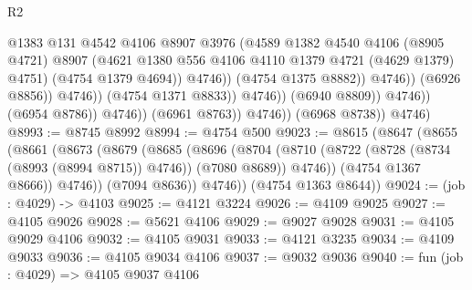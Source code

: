 \begin{lexlean}{R2}
\begin{coremodule}
                                                @1383
                                                @131
                                                @4542
                                                @4106
                                                @8907
                                                @3976
                                                (@4589
                                                  @1382
                                                  @4540
                                                  @4106
                                                  (@8905 @4721)
                                                  @8907
                                                  (@4621
                                                    @1380
                                                    @556
                                                    @4106
                                                    @4110
                                                    @1379
                                                    @4721
                                                    (@4629 @1379)
                                                    @4751)
                                                  (@4754 @1379 @4694))
                                                @4746))
                                            (@4754 @1375 @8882))
                                          @4746))
                                      (@6926 @8856))
                                    @4746))
                                (@4754 @1371 @8833))
                              @4746))
                          (@6940 @8809))
                        @4746))
                    (@6954 @8786))
                  @4746))
              (@6961 @8763))
            @4746))
        (@6968 @8738))
      @4746)
@8993 := @8745 @8992
@8994 := @4754 @500
@9023 := @8615
    (@8647
      (@8655
        (@8661
          (@8673
            (@8679
              (@8685
                (@8696
                  (@8704
                    (@8710 (@8722 (@8728 (@8734 (@8993 (@8994 @8715)) @4746)) (@7080 @8689)) @4746))
                  (@4754 @1367 @8666))
                @4746))
            (@7094 @8636))
          @4746))
      (@4754 @1363 @8644))
@9024 := (job : @4029) -> @4103
@9025 := @4121 @3224
@9026 := @4109 @9025
@9027 := @4105 @9026
@9028 := @5621 @4106
@9029 := @9027 @9028
@9031 := @4105 @9029 @4106
@9032 := @4105 @9031
@9033 := @4121 @3235
@9034 := @4109 @9033
@9036 := @4105 @9034 @4106
@9037 := @9032 @9036
@9040 := fun (job : @4029) => @4105 @9037 @4106

\end{coremodule}
\end{lexlean}
